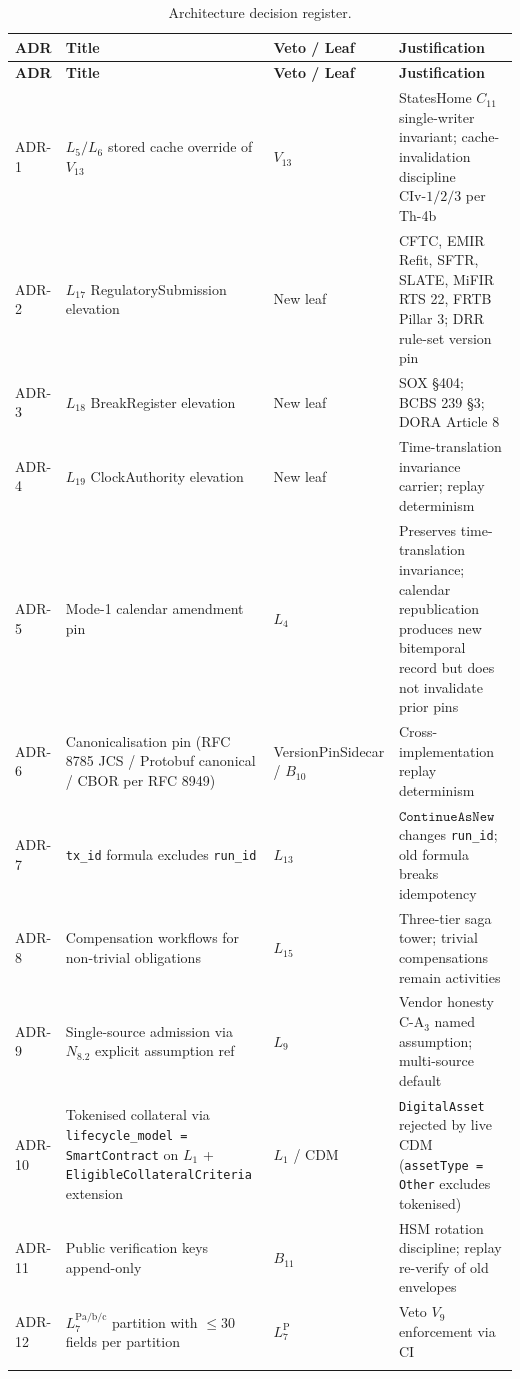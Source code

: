 \documentclass[11pt,a4paper]{article}
\begin{document}
\begin{center}
\renewcommand{\arraystretch}{1.10}
\begin{longtable}{@{}p{1.0cm}p{4.6cm}p{2.8cm}p{6.5cm}@{}}
\toprule
\textbf{ADR} & \textbf{Title} & \textbf{Veto / Leaf} & \textbf{Justification} \\
\midrule
\endfirsthead
\toprule
\textbf{ADR} & \textbf{Title} & \textbf{Veto / Leaf} & \textbf{Justification} \\
\midrule
\endhead
\bottomrule
\endfoot
ADR-1  & $L_5/L_6$ stored cache override of $V_{13}$ & $V_{13}$ & StatesHome $C_{11}$ single-writer invariant; cache-invalidation discipline $\mathrm{CIv}\textrm{-}1/2/3$ per Th-4b \\
ADR-2  & $L_{17}$ RegulatorySubmission elevation & New leaf & CFTC, EMIR Refit, SFTR, SLATE, MiFIR RTS 22, FRTB Pillar 3; DRR rule-set version pin \\
ADR-3  & $L_{18}$ BreakRegister elevation & New leaf & SOX \S404; BCBS 239 \S3; DORA Article 8 \\
ADR-4  & $L_{19}$ ClockAuthority elevation & New leaf & Time-translation invariance carrier; replay determinism \\
ADR-5  & Mode-1 calendar amendment pin & $L_4$ & Preserves time-translation invariance; calendar republication produces new bitemporal record but does not invalidate prior pins \\
ADR-6  & Canonicalisation pin (RFC 8785 JCS / Protobuf canonical / CBOR per RFC 8949) & VersionPinSidecar / $B_{10}$ & Cross-implementation replay determinism \\
ADR-7  & \texttt{tx\_id} formula excludes \texttt{run\_id} & $L_{13}$ & $\texttt{ContinueAsNew}$ changes \texttt{run\_id}; old formula breaks idempotency \\
ADR-8  & Compensation workflows for non-trivial obligations & $L_{15}$ & Three-tier saga tower; trivial compensations remain activities \\
ADR-9  & Single-source admission via $N_{8.2}$ explicit assumption ref & $L_9$ & Vendor honesty $\mathrm{C\textrm{-}A}_3$ named assumption; multi-source default \\
ADR-10 & Tokenised collateral via \texttt{lifecycle\_model = SmartContract} on $L_1$ + \texttt{EligibleCollateralCriteria} extension & $L_1$ / CDM & \texttt{DigitalAsset} rejected by live CDM (\texttt{assetType = Other} excludes tokenised) \\
ADR-11 & Public verification keys append-only & $B_{11}$ & HSM rotation discipline; replay re-verify of old envelopes \\
ADR-12 & $L_7^{\mathrm{Pa/b/c}}$ partition with $\le 30$ fields per partition & $L_7^{\mathrm{P}}$ & Veto $V_9$ enforcement via CI \\
\caption{Architecture decision register.}
\label{tab:adr}
\end{longtable}
\end{center}
\end{document}
